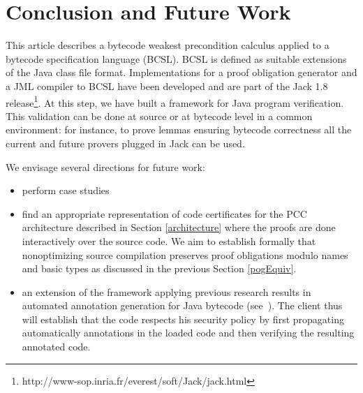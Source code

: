 \section{Conclusion and Future Work}\label{conclusion}
This article describes a bytecode weakest precondition calculus applied to a bytecode specification language (BCSL).
BCSL is defined as suitable extensions of the Java class file format.
Implementations for a proof obligation generator and a JML compiler to BCSL have been developed and are part of the Jack 1.8 release\footnote{http://www-sop.inria.fr/everest/soft/Jack/jack.html}.
At this step, we have built a framework for Java program verification. This validation can be done at source or at bytecode level in a common environment: for instance, to prove lemmas ensuring bytecode correctness all the current and future provers plugged in Jack can be used.

 We envisage several directions for future work:
\begin{itemize}
  \item perform case studies
  \item find an appropriate representation of code certificates for the PCC architecture described in Section \ref{architecture}
  where the proofs are done interactively over the source code. We aim to establish formally that nonoptimizing source compilation
preserves proof obligations modulo names and basic types as discussed in the previous Section \ref{pogEquiv}.
   
  \item an extension of the framework applying previous research results in automated annotation generation for
 Java bytecode (see~\cite{PBBHL}). The client thus will establish that the code respects his security policy %
by first propagating automatically annotations in the loaded code and then verifying the resulting annotated code.

\end{itemize}



